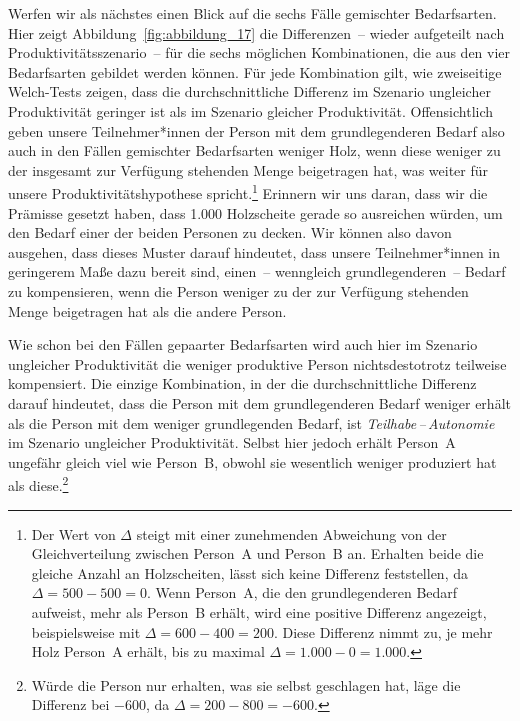 \documentclass[justified,nobib,nohyper,symmetric,twoside]{tufte-book}
\begin{document}
Werfen wir als nächstes einen Blick auf die sechs Fälle gemischter Bedarfsarten.
Hier zeigt Abbildung~\ref{fig:abbildung_17} die Differenzen~-- wieder aufgeteilt nach Produktivitätsszenario~-- für die sechs möglichen Kombinationen, die aus den vier Bedarfsarten gebildet werden können.
Für jede Kombination gilt, wie zweiseitige Welch-Tests zeigen, dass die durchschnittliche Differenz im Szenario ungleicher Produktivität geringer ist als im Szenario gleicher Produktivität.
Offensichtlich geben unsere Teilnehmer*innen der Person mit dem grundlegenderen Bedarf also auch in den Fällen gemischter Bedarfsarten weniger Holz, wenn diese weniger zu der insgesamt zur Verfügung stehenden Menge beigetragen hat, was weiter für unsere Produktivitätshypothese spricht.\footnote[][1cm]{Der Wert von $\Delta$ steigt mit einer zunehmenden Abweichung von der Gleichverteilung zwischen Person~A und Person~B an. Erhalten beide die gleiche Anzahl an Holzscheiten, lässt sich keine Differenz feststellen, da $\Delta = \textrm{500} - \textrm{500} = \textrm{0}$. Wenn Person~A, die den grundlegenderen Bedarf aufweist, mehr als Person~B erhält, wird eine posi\-tive Differenz angezeigt, beispielsweise mit $\Delta = \textrm{600} - \textrm{400} = \textrm{200}$. Diese Differenz nimmt zu, je mehr Holz Person~A erhält, bis zu maximal $\Delta = \textrm{1.000} - \textrm{0} = \textrm{1.000}$.} Erinnern wir uns daran, dass wir die Prämisse gesetzt haben, dass 1.000 Holzscheite gerade so ausreichen würden, um den Bedarf einer der beiden Personen zu decken.
Wir können also davon ausgehen, dass dieses Muster darauf hindeutet, dass unsere Teilnehmer*innen in geringerem Maße dazu bereit sind, einen~-- wenngleich grundlegenderen~-- Bedarf zu kompensieren, wenn die Person weniger zu der zur Verfügung stehenden Menge beigetragen hat als die andere Person.

Wie schon bei den Fällen gepaarter Bedarfsarten wird auch hier im Szenario ungleicher Produktivität die weniger produktive Person nichtsdestotrotz teilweise kompensiert.
Die einzige Kombination, in der die durchschnittliche Differenz darauf hindeutet, dass die Person mit dem grundlegenderen Bedarf weniger erhält als die Person mit dem weniger grundlegenden Bedarf, ist \textit{Teilhabe\,--\,Autonomie} im Szenario ungleicher Produktivität.
Selbst hier jedoch erhält Person~A ungefähr gleich viel wie Person~B, obwohl sie wesentlich weniger produziert hat als diese.\footnote{Würde die Person nur erhalten, was sie selbst geschlagen hat, läge die Differenz bei $-\textrm{600}$, da $\Delta = \textrm{200} - \textrm{800} = -\textrm{600}$.}
\end{document}
